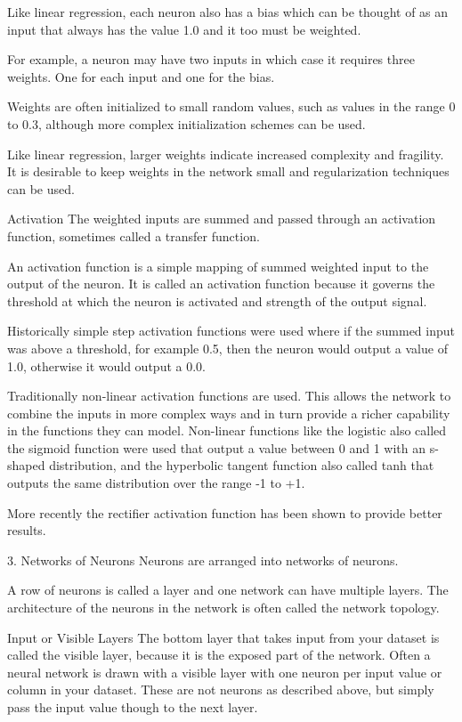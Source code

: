 \documentclass[12pt]{article}
\begin{document}
Like linear regression, each neuron also has a bias which can be thought of as an input that always has the value 1.0 and it too must be weighted.

For example, a neuron may have two inputs in which case it requires three weights. One for each input and one for the bias.

Weights are often initialized to small random values, such as values in the range 0 to 0.3, although more complex initialization schemes can be used.

Like linear regression, larger weights indicate increased complexity and fragility. It is desirable to keep weights in the network small and regularization techniques can be used.

Activation
The weighted inputs are summed and passed through an activation function, sometimes called a transfer function.

An activation function is a simple mapping of summed weighted input to the output of the neuron. It is called an activation function because it governs the threshold at which the neuron is activated and strength of the output signal.

Historically simple step activation functions were used where if the summed input was above a threshold, for example 0.5, then the neuron would output a value of 1.0, otherwise it would output a 0.0.

Traditionally non-linear activation functions are used. This allows the network to combine the inputs in more complex ways and in turn provide a richer capability in the functions they can model. Non-linear functions like the logistic also called the sigmoid function were used that output a value between 0 and 1 with an s-shaped distribution, and the hyperbolic tangent function also called tanh that outputs the same distribution over the range -1 to +1.

More recently the rectifier activation function has been shown to provide better results.

3. Networks of Neurons
Neurons are arranged into networks of neurons.

A row of neurons is called a layer and one network can have multiple layers. The architecture of the neurons in the network is often called the network topology.

Input or Visible Layers
The bottom layer that takes input from your dataset is called the visible layer, because it is the exposed part of the network. Often a neural network is drawn with a visible layer with one neuron per input value or column in your dataset. These are not neurons as described above, but simply pass the input value though to the next layer.
\end{document}
